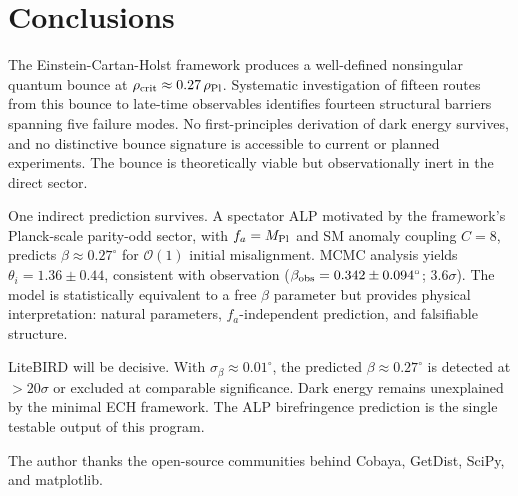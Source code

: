 \documentclass[aps,prd,twocolumn,superscriptaddress,showpacs,preprintnumbers,nofootinbib,longbibliography,floatfix]{revtex4-2}
\newcommand{\MPl}{M_{\rm Pl}}
\newcommand{\rhocrit}{\rho_{\rm crit}}
\newcommand{\rhoPl}{\rho_{\rm Pl}}
\begin{document}
\section{Conclusions}\label{sec:conclusions}

The Einstein-Cartan-Holst framework produces a well-defined nonsingular
quantum bounce at $\rhocrit \approx 0.27\,\rhoPl$.  Systematic investigation
of fifteen routes from this bounce to late-time observables identifies
fourteen structural barriers spanning five failure modes.  No first-principles
derivation of dark energy survives, and no distinctive bounce signature is
accessible to current or planned experiments.  The bounce is theoretically
viable but observationally inert in the direct sector.

One indirect prediction survives.  A spectator ALP motivated by the
framework's Planck-scale parity-odd sector, with $f_a = \MPl$ and SM anomaly
coupling $C = 8$, predicts $\beta \approx 0.27^\circ$ for
$\mathcal{O}(1)$ initial misalignment.  MCMC analysis yields
$\theta_i = 1.36 \pm 0.44$, consistent with observation
($\beta_{\rm obs} = 0.342 \pm 0.094^\circ$; $3.6\sigma$).  The model is
statistically equivalent to a free $\beta$ parameter but provides physical
interpretation: natural parameters, $f_a$-independent prediction, and
falsifiable structure.

LiteBIRD will be decisive.  With $\sigma_\beta \approx 0.01^\circ$, the
predicted $\beta \approx 0.27^\circ$ is detected at $> 20\sigma$ or excluded
at comparable significance.  Dark energy remains unexplained by the minimal
ECH framework.  The ALP birefringence prediction is the single testable
output of this program.


\begin{acknowledgments}
The author thanks the open-source communities behind Cobaya, GetDist,
SciPy, and matplotlib.
\end{acknowledgments}



\end{document}
